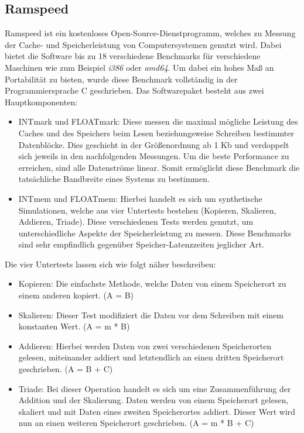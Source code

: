 \subsection{Ramspeed}\label{kap:ramspeed}
Ramspeed ist ein kostenloses Open-Source-Dienstprogramm, welches zu Messung der Cache- und Speicherleistung von Computersystemen genutzt wird.
\newpage
Dabei bietet die Software bis zu 18 verschiedene
Benchmarks für verschiedene Maschinen wie zum Beispiel \emph{i386} oder \emph{amd64}. Um dabei ein hohes Maß an Portabilität zu bieten, wurde diese Benchmark vollständig in der Programmiersprache
C geschrieben. Das Softwarepaket besteht aus zwei Hauptkomponenten:~\cite{ramspeed}
\begin{itemize}
  \item INTmark und FLOATmark: Diese messen die maximal mögliche Leistung des Caches und des Speichers beim Lesen beziehungsweise Schreiben bestimmter Datenblöcke. Dies geschieht in der Größenordnung ab 1 Kb und
                               verdoppelt sich jeweils in den nachfolgenden Messungen. Um die beste Performance zu erreichen, sind alle Datenströme linear. Somit ermöglicht diese Benchmark die
                               tatsächliche Bandbreite eines Systems zu bestimmen.
  \item INTmem und FLOATmem: Hierbei handelt es sich um synthetische Simulationen, welche aus vier Untertests bestehen (Kopieren, Skalieren, Addieren, Triade). Diese verschiedenen Tests werden
                             genutzt, um unterschiedliche Aspekte der Speicherleistung zu messen. Diese Benchmarks sind sehr empfindlich gegenüber Speicher-Latenzzeiten jeglicher Art.
\end{itemize}

Die vier Untertests lassen sich wie folgt näher beschreiben:
\begin{itemize}
  \item Kopieren: Die einfachste Methode, welche Daten von einem Speicherort zu einem anderen kopiert. (A = B)
  \item Skalieren: Dieser Test modifiziert die Daten vor dem Schreiben mit einem konstanten Wert. (A = m * B)
  \item Addieren: Hierbei werden Daten von zwei verschiedenen Speicherorten gelesen, miteinander addiert und letztendlich an einen dritten Speicherort geschrieben. (A = B + C)
  \item Triade: Bei dieser Operation handelt es sich um eine Zusammenführung der Addition und der Skalierung. Daten werden von einem Speicherort gelesen, skaliert und mit Daten eines zweiten Speicherortes
                addiert. Dieser Wert wird nun an einen weiteren Speicherort geschrieben. (A = m * B + C)
\end{itemize}

